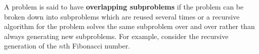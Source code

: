 \documentclass{article}
\begin{document}
        
        
        
        
        
        
    
    A problem is said to have \textbf{overlapping subproblems} if the problem can be broken down into subproblems which are reused several times or a recursive algorithm for the problem solves the same subproblem over and over rather than always generating new subproblems. For example, consider the recursive generation of the $n$th Fibonacci number.
    
\end{document}
